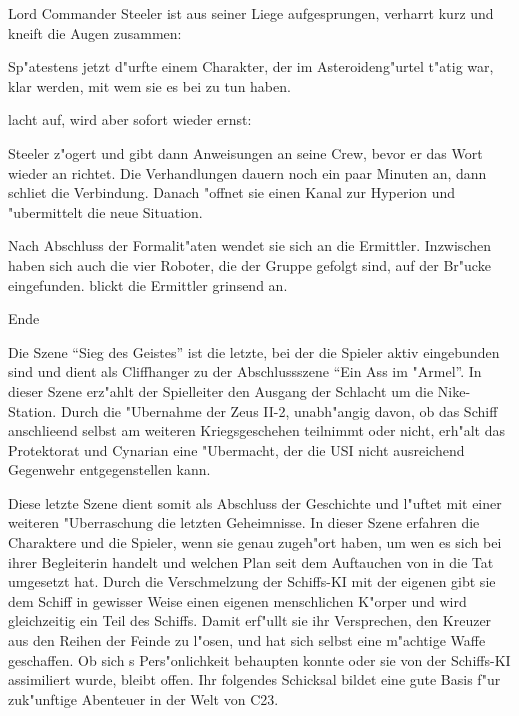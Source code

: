 Lord Commander Steeler ist aus seiner Liege aufgesprungen, verharrt kurz und kneift die Augen zusammen:


Sp"atestens jetzt d"urfte einem Charakter, der im Asteroideng"urtel t"atig war, klar werden, mit wem sie es bei \xl{} zu tun haben.

\xl{} lacht auf, wird aber sofort wieder ernst:


Steeler z"ogert und gibt dann Anweisungen an seine Crew, bevor er das Wort wieder an \xl{} richtet. Die Verhandlungen dauern noch ein paar Minuten an, dann schlie\3t \xl{} die Verbindung. Danach "offnet sie einen Kanal zur Hyperion und "ubermittelt die neue Situation.

Nach Abschluss der Formalit"aten wendet sie sich an die Ermittler. Inzwischen haben sich auch die vier Roboter, die der Gruppe gefolgt sind, auf der Br"ucke eingefunden. \xl{} blickt die Ermittler grinsend an.


\begin{remarks}
	\begin{center}\huge{}Ende\end{center}

	Die Szene ``Sieg des Geistes'' ist die letzte, bei der die Spieler aktiv eingebunden sind und dient als Cliffhanger zu der Abschlussszene ``Ein Ass im "Armel''. In dieser Szene erz"ahlt der Spielleiter den Ausgang der Schlacht um die Nike-Station. Durch die "Ubernahme der Zeus II-2, unabh"angig davon, ob das Schiff anschlie\3end selbst am weiteren Kriegsgeschehen teilnimmt oder nicht, erh"alt das Protektorat und Cynarian eine "Ubermacht, der die USI nicht ausreichend Gegenwehr entgegenstellen kann.

	Diese letzte Szene dient somit als Abschluss der Geschichte und l"uftet mit einer weiteren "Uberraschung die letzten Geheimnisse. In dieser Szene erfahren die Charaktere und die Spieler, wenn sie genau zugeh"ort haben, um wen es sich bei ihrer Begleiterin handelt und welchen Plan \xl{} seit dem Auftauchen von \ml{} in die Tat umgesetzt hat. Durch die Verschmelzung der Schiffs-KI mit der eigenen gibt sie dem Schiff in gewisser Weise einen eigenen menschlichen K"orper und wird gleichzeitig ein Teil des Schiffs. Damit erf"ullt sie ihr Versprechen, den Kreuzer aus den Reihen der Feinde zu l"osen, und hat sich selbst eine m"achtige Waffe geschaffen. Ob sich \xl{}s Pers"onlichkeit behaupten konnte oder sie von der Schiffs-KI assimiliert wurde, bleibt offen. Ihr folgendes Schicksal bildet eine gute Basis f"ur zuk"unftige Abenteuer in der Welt von C23.
\end{remarks}
\vfill\pagebreak

